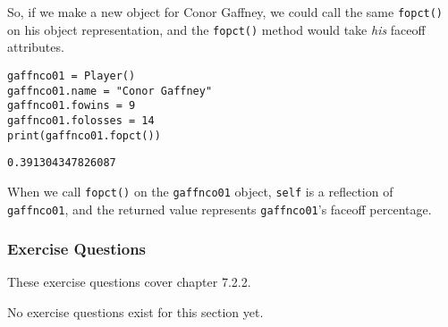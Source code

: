So, if we make a new object for Conor Gaffney, we could call the same \verb|fopct()| on his object representation, and the \verb|fopct()| method would take \textit{his} faceoff attributes.
\begin{lstlisting}[style=pippython]
gaffnco01 = Player()
gaffnco01.name = "Conor Gaffney"
gaffnco01.fowins = 9
gaffnco01.folosses = 14
print(gaffnco01.fopct())
\end{lstlisting}
\begin{lstlisting}[style=none]
0.391304347826087
\end{lstlisting}
When we call \verb|fopct()| on the \verb|gaffnco01| object, \verb|self| is a reflection of \verb|gaffnco01|, and the returned value represents \verb|gaffnco01|'s faceoff percentage.
\subsubsection*{Exercise Questions}
These exercise questions cover chapter 7.2.2.

No exercise questions exist for this section yet.
